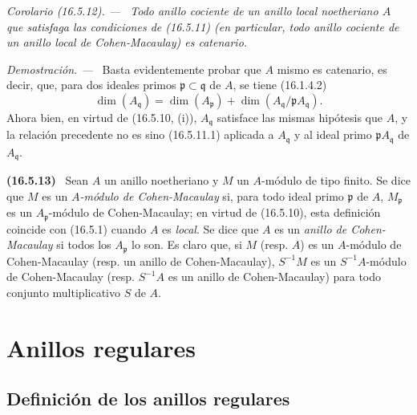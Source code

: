 \documentclass[10pt,oneside]{book}
\makeatletter
\newcommand{\setmanualcurrentlabel}[1]{\def\@currentlabel{#1}}
\newenvironment{env}[1][]{\setmanualcurrentlabel{#1}\par\medskip\noindent\textbf{(#1)}\ }{\par}
\newenvironment{corollary}[1][]{%
  \setmanualcurrentlabel{#1}\par\medskip\noindent\itshape Corolario (#1). ---\ }{\par}
\newenvironment{proof}{%
  \par\medskip\noindent\textit{Demostración. ---\ }}{\par}
\makeatother
\begin{document}
\begin{corollary}[16.5.12]
\label{0.16.5.12-es}
Todo anillo cociente de un anillo local noetheriano $A$ que satisfaga las
condiciones de \textup{(16.5.11)} (en particular, todo anillo cociente de un anillo local
de Cohen-Macaulay) es catenario.
\end{corollary}

\begin{proof}
Basta evidentemente probar que $A$ mismo es catenario, es decir, que,
para dos ideales primos $\mathfrak{p}\subset\mathfrak{q}$ de $A$, se tiene
(16.1.4.2)
\[
  \dim(A_{\mathfrak{q}})
  =\dim(A_{\mathfrak{p}})
  +\dim(A_{\mathfrak{q}}/\mathfrak{p}A_{\mathfrak{q}}).
\]
Ahora bien, en virtud de (16.5.10, (i)), $A_{\mathfrak{q}}$ satisface las mismas
hipótesis que $A$, y la relación precedente no es sino
(16.5.11.1) aplicada a $A_{\mathfrak{q}}$ y al ideal primo
$\mathfrak{p}A_{\mathfrak{q}}$ de $A_{\mathfrak{q}}$.
\end{proof}

\begin{env}[16.5.13]
\label{0.16.5.13-es}
Sean $A$ un anillo noetheriano y $M$ un $A$-módulo de tipo finito. Se dice que
$M$ es un \emph{$A$-módulo de Cohen-Macaulay} si, para todo ideal primo
$\mathfrak{p}$ de $A$, $M_{\mathfrak{p}}$ es un $A_{\mathfrak{p}}$-módulo
de Cohen-Macaulay; en virtud de (16.5.10), esta definición coincide con
(16.5.1) cuando $A$ es \emph{local}. Se dice que $A$ es un
\emph{anillo de Cohen-Macaulay} si todos los $A_{\mathfrak{p}}$ lo son. Es
claro que, si $M$ (resp. $A$) es un $A$-módulo de Cohen-Macaulay (resp. un
anillo de Cohen-Macaulay), $S^{-1}M$ es un $S^{-1}A$-módulo de Cohen-Macaulay
(resp. $S^{-1}A$ es un anillo de Cohen-Macaulay) para todo conjunto
multiplicativo $S$ de $A$.
\end{env}

\section{Anillos regulares}
\label{section:0.17-es}

\subsection{Definición de los anillos regulares}
\label{subsection:0.17.1-es}
\end{document}
